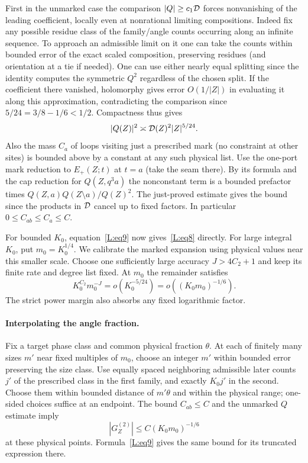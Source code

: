 First in the unmarked case the comparison \(|Q|\ge c_1{\cal D}\) forces nonvanishing of the leading coefficient, locally even at nonrational limiting compositions. Indeed fix any possible residue class of the family/angle counts occurring along an infinite sequence. To approach an admissible limit on it one can take the counts within bounded error of the exact scaled composition, preserving residues (and orientation at a tie if needed). One can use either nearly equal splitting since the identity computes the symmetric \(Q^2\) regardless of the chosen split. If the coefficient there vanished, holomorphy gives error \(O(1/|Z|)\) in evaluating it along this approximation, contradicting the comparison since \(5/24=3/8-1/6<1/2\). Compactness thus gives
\[
 |Q(Z)|^2\asymp {\cal D}(Z)^2 |Z|^{5/24}.
\]
Also the mass \(C_a\) of loops visiting just a prescribed mark (no constraint at other sites) is bounded above by a constant at any such physical list. Use the one-port mark reduction to \(E_+(Z;t)\) at \(t=a\) (take the seam there). By its formula and the cap reduction for \(Q(Z,q^3a)\) the nonconstant term is a bounded prefactor times \(Q(Z,a)Q(Z\setminus a)/Q(Z)^2\). The just-proved estimate gives the bound since the products in \({\cal D}\) cancel up to fixed factors. In particular \(0\le C_{ab}\le C_a\le C\).

For bounded $K_0$, equation~\eqref{L:eq9} now gives~\eqref{L:eq8}
directly. For large integral $K_0$, put $m_0=K_0^{1/4}$. We calibrate
the marked expansion using physical values near this smaller scale.
Choose one sufficiently large accuracy $J>4C_2+1$ and keep its finite
rate and degree list fixed. At $m_0$ the remainder satisfies
\[
 K_0^{C_2}m_0^{-J}=o(K_0^{-5/24})
                   =o((K_0m_0)^{-1/6}).
\]
The strict power margin also absorbs any fixed logarithmic factor.

\paragraph{Interpolating the angle fraction.}
Fix a target phase class and common physical fraction $\theta$.
At each of finitely many sizes $m'$ near fixed multiples of $m_0$,
choose an integer $m'$ within bounded error preserving the size class.
Use equally spaced neighboring admissible later counts $j'$ of the
prescribed class in the first family, and exactly $K_0j'$ in the second.
Choose them within bounded distance of $m'\theta$ and within the physical
range; one-sided choices suffice at an endpoint. The bound $C_{ab}\le C$
and the unmarked $Q$ estimate imply
\[
 |G_Z^{(2)}|\le C(K_0m_0)^{-1/6}
\]
at these physical points. Formula~\eqref{L:eq9} gives the same bound for
its truncated expression there.

